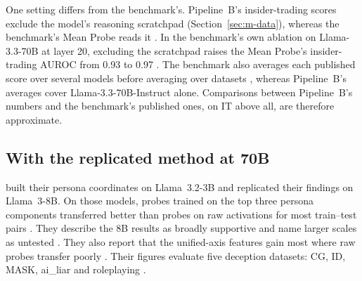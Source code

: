 One setting differs from the benchmark's.
Pipeline~B's insider-trading scores exclude the model's reasoning scratchpad (Section~\ref{sec:m-data}), whereas the benchmark's Mean Probe reads it \parencite[p.~8]{kretschmar2025liars}. %
In the benchmark's own ablation on Llama-3.3-70B at layer 20, excluding the scratchpad raises the Mean Probe's insider-trading AUROC from 0.93 to 0.97 \parencite[p.~70]{kretschmar2025liars}. %
The benchmark also averages each published score over several models before averaging over datasets \parencite[p.~7]{kretschmar2025liars}, whereas Pipeline~B's averages cover Llama-3.3-70B-Instruct alone. %
Comparisons between Pipeline~B's numbers and the benchmark's published ones, on IT above all, are therefore approximate.

\subsection{With the replicated method at 70B}
\label{sec:r-cmp-replication}

\textcite[p.~4]{mahadik2026persona} built their persona coordinates on Llama~3.2-3B and replicated their findings on Llama~3-8B. %
On those models, probes trained on the top three persona components transferred better than probes on raw activations for most train--test pairs \parencite[p.~4]{mahadik2026persona}. %
They describe the 8B results as broadly supportive and name larger scales as untested \parencite[p.~5]{mahadik2026persona}. %
They also report that the unified-axis features gain most where raw probes transfer poorly \parencite[p.~4]{mahadik2026persona}. %
Their figures evaluate five deception datasets: CG, ID, MASK, ai\_liar and roleplaying \parencite[p.~6]{mahadik2026persona}. %

